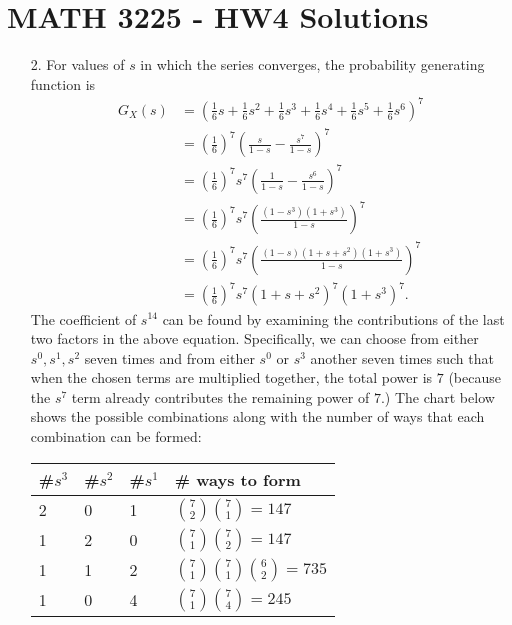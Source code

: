 \documentclass[a4paper,12pt]{article}
\begin{document}
\section*{MATH 3225 - HW4 Solutions}
\begin{enumerate}
    \item[2.] 
        For values of $s$ in which the series converges, the probability generating function is
        \begin{align*}
            G_X(s) &= \left( \frac{1}{6}s + \frac{1}{6}s^2 + \frac{1}{6}s^3 + \frac{1}{6}s^4 + \frac{1}{6}s^5 + \frac{1}{6}s^6 \right)^7 \\
            &= \left( \frac{1}{6} \right)^7 \left( \frac{s}{1 - s} - \frac{s^7}{1 - s} \right)^7 \\
            &= \left( \frac{1}{6} \right)^7 s^7 \left( \frac{1}{1 - s} - \frac{s^6}{1 - s} \right)^7 \\
            &= \left( \frac{1}{6} \right)^7 s^7 \left( \frac{(1 - s^3)(1 + s^3)}{1 - s} \right)^7 \\
            &= \left( \frac{1}{6} \right)^7 s^7 \left( \frac{(1 - s)(1 + s + s^2)(1 + s^3)}{1 - s} \right)^7 \\
            &= \left( \frac{1}{6} \right)^7 s^7 (1 + s + s^2)^7 (1 + s^3)^7.
        \end{align*}
        The coefficient of $s^14$ can be found by examining the contributions of the last two factors in the above equation. Specifically, we can choose from either $s^0, s^1, s^2$ seven times and from either $s^0$ or $s^3$ another seven times such that when the chosen terms are multiplied together, the total power is $7$ (because the $s^7$ term already contributes the remaining power of $7$.) The chart below shows the possible combinations along with the number of ways that each combination can be formed:
        \begin{center}
            \begin{tabular}{| l | l | l | l |}
                \hline
                \#$s^3$ & \#$s^2$ & \#$s^1$ & \# ways to form \\ \hline
                2 & 0 & 1 & $\binom{7}{2} \binom{7}{1} = 147$ \\ \hline
                1 & 2 & 0 & $\binom{7}{1} \binom{7}{2} = 147$ \\ \hline
                1 & 1 & 2 & $\binom{7}{1} \binom{7}{1} \binom{6}{2} = 735$ \\ \hline
                1 & 0 & 4 & $\binom{7}{1} \binom{7}{4} = 245$ \\ \hline

\end{tabular}
\end{center}
\end{enumerate}
\end{document}
